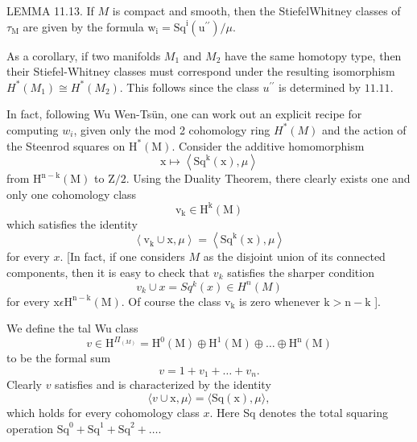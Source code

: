 \documentclass[10pt]{article}
\begin{document}
LEMMA 11.13. If $M$ is compact and smooth, then the StiefelWhitney classes of $\tau_{\mathrm{M}}$ are given by the formula $\mathrm{w}_{\mathrm{i}}=\mathrm{Sq}^{\mathrm{i}}\left(\mathrm{u}^{\prime \prime}\right) / \mu$.

As a corollary, if two manifolds $M_{1}$ and $M_{2}$ have the same homotopy type, then their Stiefel-Whitney classes must correspond under the resulting isomorphism $H^{*}\left(M_{1}\right) \cong H^{*}\left(M_{2}\right)$. This follows since the class $u^{\prime \prime}$ is determined by $11.11$.

In fact, following Wu Wen-Tsün, one can work out an explicit recipe for computing $w_{i}$, given only the mod 2 cohomology ring $H^{*}(M)$ and the action of the Steenrod squares on $\mathrm{H}^{*}(\mathrm{M})$. Consider the additive homomorphism
$$
\mathrm{x} \mapsto\left\langle\mathrm{Sq}^{\mathrm{k}}(\mathrm{x}), \mu\right\rangle
$$
from $\mathrm{H}^{\mathrm{n}-\mathrm{k}}(\mathrm{M})$ to $\mathrm{Z} / 2$. Using the Duality Theorem, there clearly exists one and only one cohomology class
$$
\mathrm{v}_{\mathrm{k}} \in \mathrm{H}^{\mathrm{k}}(\mathrm{M})
$$
which satisfies the identity
$$
\left\langle\mathrm{v}_{\mathrm{k}} \cup \mathrm{x}, \mu\right\rangle=\left\langle\mathrm{Sq}^{\mathrm{k}}(\mathrm{x}), \mu\right\rangle
$$
for every $x$. [In fact, if one considers $M$ as the disjoint union of its connected components, then it is easy to check that $v_{k}$ satisfies the sharper condition
$$
v_{k} \cup x=S q^{k}(x) \in H^{n}(M)
$$
for every $\mathrm{x} \epsilon \mathrm{H}^{\mathrm{n}-\mathrm{k}}(\mathrm{M})$. Of course the class $\mathrm{v}_{\mathrm{k}}$ is zero whenever $\mathrm{k}>\mathrm{n}-\mathrm{k}$ ].

We define the tal Wu class
$$
v \in \mathrm{H}^{\Pi_{(M)}}=\mathrm{H}^{0}(\mathrm{M}) \oplus \mathrm{H}^{1}(\mathrm{M}) \oplus \ldots \oplus \mathrm{H}^{\mathrm{n}}(\mathrm{M})
$$
to be the formal sum
$$
v=1+v_{1}+\ldots+v_{n} .
$$
Clearly $v$ satisfies and is characterized by the identity
$$
\langle v \cup \mathrm{x}, \mu\rangle=\langle\mathrm{Sq}(\mathrm{x}), \mu\rangle,
$$
which holds for every cohomology class $x$. Here Sq denotes the total squaring operation $\mathrm{Sq}^{0}+\mathrm{Sq}^{1}+\mathrm{Sq}^{2}+\ldots$.
\end{document}
